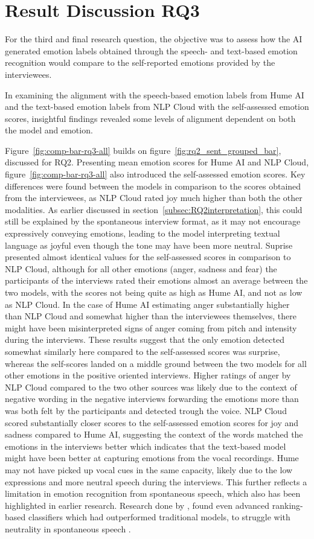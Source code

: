
\section{Result Discussion RQ3}
For the third and final research question, the objective was to assess how the AI generated emotion labels obtained through the speech- and text-based emotion recognition would compare to the self-reported emotions provided by the interviewees.

In examining the alignment with the speech-based emotion labels from Hume AI and the text-based emotion labels from NLP Cloud with the self-assessed emotion scores, insightful findings revealed some levels of alignment dependent on both the model and emotion.

Figure~\ref{fig:comp-bar-rq3-all} builds on figure~\ref{fig:rq2_sent_grouped_bar}, discussed for RQ2. Presenting mean emotion scores for Hume AI and NLP Cloud, figure~\ref{fig:comp-bar-rq3-all} also introduced the self-assessed emotion scores.
Key differences were found between the models in comparison to the scores obtained from the interviewees, as NLP Cloud rated joy much higher than both the other modalities. As earlier discussed in section~\ref{subsec:RQ2interpretation}, this could still be explained by the spontaneous interview format, as it may not encourage expressively conveying emotions, leading to the model interpreting textual language as joyful even though the tone may have been more neutral.
Suprise presented almost identical values for the self-assessed scores in comparison to NLP Cloud, although for all other emotions (anger, sadness and fear) the participants of the interviews rated their emotions almost an average between the two models, with the scores not being quite as high as Hume AI, and not as low as NLP Cloud. In the case of Hume AI estimating anger substantially higher than NLP Cloud and somewhat higher than the interviewees themselves, there might have been misinterpreted signs of anger coming from pitch and intensity during the interviews. These results suggest that the only emotion detected somewhat similarly here compared to the self-assessed scores was surprise, whereas the self-scores landed on a middle ground between the two models for all other emotions in the positive oriented interviews.
Higher ratings of anger by NLP Cloud compared to the two other sources was likely due to the context of negative wording in the negative interviews forwarding the emotions more than was both felt by the participants and detected trough the voice.
NLP Cloud scored substantially closer scores to the self-assessed emotion scores for joy and sadness compared to Hume AI, suggesting the context of the words matched the emotions in the interviews better which indicates that the text-based model might have been better at capturing emotions from the vocal recordings. Hume may not have picked up vocal cues in the same capacity, likely due to the low expressions and more neutral speech during the interviews. This further reflects a limitation in emotion recognition from spontaneous speech, which also has been highlighted in earlier research. Research done by \textcite{Cao2015}, found even advanced ranking-based classifiers which had outperformed traditional models, to struggle with neutrality in spontaneous speech \autocite{Cao2015}.
